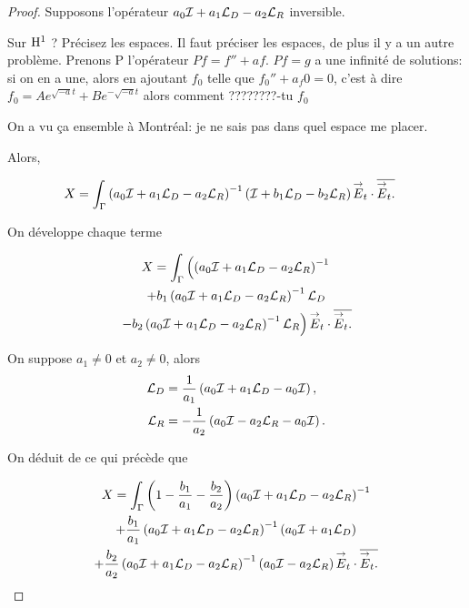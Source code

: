   \begin{proof}
    Supposons l'opérateur \(a_0\oI + a_1 \LD - a_2 \LR\) inversible.
    \begin{REM}
      Sur \(\Sobolev[1]\) ? Précisez les espaces. Il faut préciser les espaces, de plus il y a un autre problème. Prenons P l'opérateur
      \(Pf=f''+af\). \(Pf=g\) a une infinité de solutions: si on en a une, alors en ajoutant  \(f_0\) telle que \(f_0''+a_f0 =0\), c'est à dire \(f_0=Ae^{\sqrt{-a}t}+Be^{-\sqrt{-a}t}\) alors comment ????????-tu \(f_0\)
    \end{REM}
    \begin{REP}
      On a vu ça ensemble à Montréal: je ne sais pas dans quel espace me placer.
    \end{REP}
   Alors,

    \begin{align*}
      X &= \int_\Gamma \left(a_0\oI + a_1 \LD - a_2 \LR \right)^{-1}\left( \oI + b_1 \LD - b_2 \LR \right) \vE_t\cdot \conj{\vE_t.}
    \end{align*}

    On développe chaque terme

    \begin{multline*}
      X = \int_\Gamma \left(\left(a_0\oI + a_1 \LD - a_2 \LR \right)^{-1}
      \right.
      \\
      + b_1 \left(a_0\oI + a_1 \LD - a_2 \LR \right)^{-1}\LD
      \\
      \left.
      - b_2 \left(a_0\oI + a_1 \LD - a_2 \LR \right)^{-1}\LR \right) \vE_t\cdot \conj{\vE_t.}
    \end{multline*}

    On suppose \(a_1\not=0\) et \(a_2\not=0\), alors
    \begin{align*}
      \LD & = \frac{1}{a_1}\left(a_0\oI + a_1 \LD - a_0\oI\right),
      \\
      \LR & = -\frac{1}{a_2}\left(a_0\oI - a_2 \LR - a_0\oI\right).
    \end{align*}


    On déduit de ce qui précède que

    \begin{multline*}
      X = \int_\Gamma \left(1-\frac{b_1}{a_1} -\frac{b_2}{a_2}\right)\left(a_0\oI + a_1 \LD - a_2 \LR \right)^{-1}
      \\
      + \frac{b_1}{a_1} \left(a_0\oI + a_1 \LD - a_2 \LR \right)^{-1}\left(a_0\oI + a_1\LD\right)
      \\
      + \frac{b_2}{a_2} \left(a_0\oI + a_1 \LD - a_2 \LR \right)^{-1}\left(a_0\oI - a_2\LR\right) \vE_t\cdot \conj{\vE_t.}
    \end{multline*}


\end{proof}
